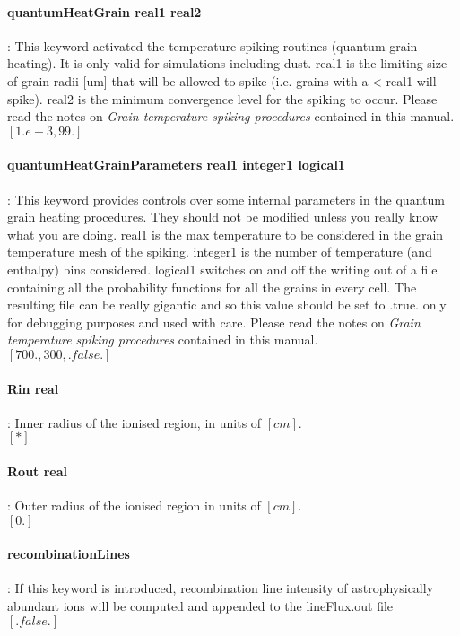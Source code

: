 \documentclass[11pt]{article}
\begin{document}
\paragraph {quantumHeatGrain real1 real2}: This keyword activated the temperature spiking routines (quantum grain heating). It is only valid for simulations including dust. real1 is the limiting size of grain radii [um] that will be allowed to spike (i.e. grains with a < real1 will spike). real2 is the minimum convergence level for the spiking to occur. Please read the notes on {\it Grain temperature spiking procedures} contained in this manual.\\
$[1.e-3, 99.]$\\

\paragraph {quantumHeatGrainParameters real1 integer1 logical1}: This keyword provides controls over some internal parameters in the quantum grain heating procedures. They should not be modified unless you really know what you are doing.  real1 is the max temperature to be considered in the grain temperature mesh of the spiking. integer1  is the number of temperature (and enthalpy) bins considered. logical1 switches on and off the writing out of a file containing all the probability functions for all the grains in every cell. The resulting file can be really gigantic and so this value should be set to .true. only for debugging purposes and used with care. Please read the notes on {\it Grain temperature spiking procedures} contained in this manual.\\
$[700., 300, .false.]$
 
\paragraph  {  Rin real}	    : Inner radius of the ionised region, in units of $[cm]$.\\
		     $[*]$\\

\paragraph  {  Rout real }      : Outer radius of the ionised region in units of $[cm]$. \\
		     $[0.]$\\

\paragraph   { recombinationLines} : If this keyword is introduced, recombination line intensity of 
                     astrophysically abundant ions will be computed and appended to the 
                     lineFlux.out file \\
		     $[.false.]$\\
\end{document}
